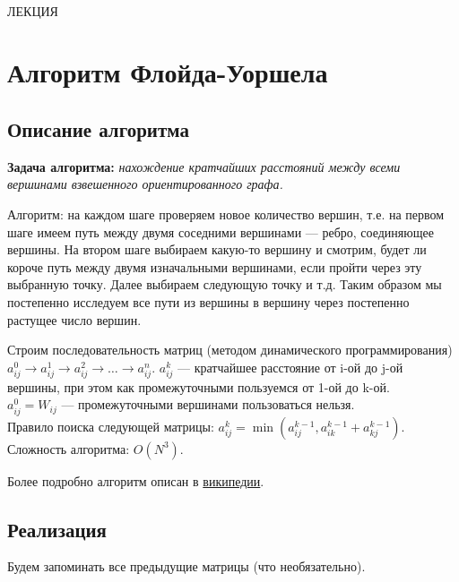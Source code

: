 \documentclass[a4paper,12pt]{article}
\theoremstyle{plain} %
\theoremstyle{definition} %
\theoremstyle{remark} %
\begin{document}
\newcommand{\lec}[1]{\addtocounter{lec}{1} \setcounter{section}{0}%
\begin{center}
{\LARGE ЛЕКЦИЯ %
\vspace{2mm}%

\textbf{#1}%
}
\end{center}
}
\newpage
\
\setcounter{lec}{5}
\lec{}
\section{Алгоритм Флойда-Уоршела}
\subsection{Описание алгоритма}
\textbf{Задача алгоритма:} \emph{нахождение кратчайших расстояний между всеми вершинами взвешенного ориентированного графа.}

Алгоритм: на каждом шаге проверяем новое количество вершин, т.е. на первом шаге имеем путь между двумя соседними вершинами --- ребро, соединяющее вершины. На втором шаге выбираем какую-то вершину и смотрим, будет ли короче путь между двумя изначальными вершинами, если пройти через эту выбранную точку. Далее выбираем следующую точку и т.д. Таким образом мы постепенно исследуем все пути из вершины в вершину через постепенно растущее число вершин. 

Строим последовательность матриц (методом динамического программирования) $a_{ij}^0 \rightarrow a^1_{ij} \rightarrow a^2_{ij} \rightarrow\dots\rightarrow a^n_{ij}$. $a^k_{ij}$ --- кратчайшее расстояние от i-ой до j-ой вершины, при этом как промежуточными пользуемся от 1-ой до k-ой.\\
$a_{ij}^0 = W_{ij}$ --- промежуточными вершинами пользоваться нельзя.\\
Правило поиска следующей матрицы: $a_{ij}^k= \min(a^{k-1}_{ij}, a^{k-1}_{ik}+a^{k-1}_{kj}).$\\
Сложность алгоритма: $O(N^3)$.

Более подробно алгоритм описан в \href{https://ru.wikipedia.org/wiki/%D0%90%D0%BB%D0%B3%D0%BE%D1%80%D0%B8%D1%82%D0%BC_%D0%A4%D0%BB%D0%BE%D0%B9%D0%B4%D0%B0_%E2%80%94_%D0%A3%D0%BE%D1%80%D1%88%D0%B5%D0%BB%D0%BB%D0%B0}{википедии}.
\subsection{Реализация}
Будем запоминать все предыдущие матрицы (что необязательно).
\end{document}
